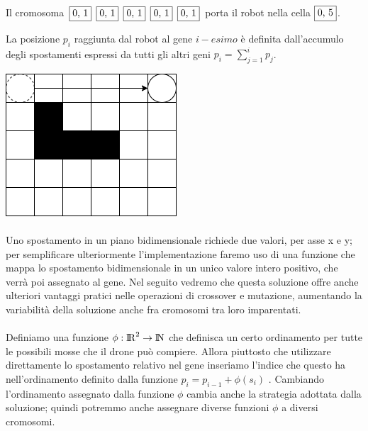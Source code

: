 \documentclass{article}
\begin{document}
\paragraph{}
Il cromosoma
\newcommand{\sep}{\hspace*{.5em}}
  \noindent
  $\fbox{0, 1} \sep \fbox{0, 1} \sep \fbox{0, 1} \sep \fbox{0, 1} \sep \fbox{0, 1}$
porta il robot nella cella $\fbox{0, 5}$.

La posizione $p_i$ raggiunta dal robot al gene $i-esimo$ è definita dall'accumulo degli spostamenti espressi da tutti gli altri geni $p_i = \sum_{j=1}^{i}p_{j}$.
\begin{center}
\includegraphics[scale=0.5]{media/image1.png}
\end{center}
\paragraph{}
Uno spostamento in un piano bidimensionale richiede due valori, per asse x e y; per semplificare ulteriormente l'implementazione faremo uso di una funzione che mappa lo spostamento bidimensionale in un unico valore intero positivo, che verrà poi assegnato al gene.
Nel seguito vedremo che questa soluzione offre anche ulteriori vantaggi pratici nelle operazioni di crossover e mutazione, aumentando la variabilità della soluzione anche fra cromosomi tra loro imparentati.

\paragraph{}
Definiamo una funzione $\phi : {\rm I\!R}^2 \rightarrow {\rm I\!N}$ che definisca un certo ordinamento per tutte le possibili mosse che il drone può compiere.
Allora piuttosto che utilizzare direttamente lo spostamento relativo nel gene inseriamo l'indice che questo ha nell'ordinamento definito dalla funzione $p_i = p_{i-1} + \phi(s_i)$ .
Cambiando l'ordinamento assegnato dalla funzione $\phi$ cambia anche la strategia adottata dalla soluzione; quindi potremmo anche assegnare diverse funzioni $\phi$ a diversi cromosomi.
\end{document}
